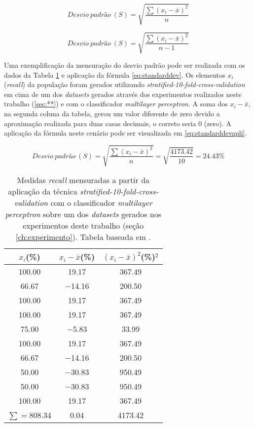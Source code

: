 \begin{equation} 
  Desvio~padrão~(S) = \sqrt{\frac{\sum{(x_{i}-\bar{x})^2}}{n}} 
  \label{eq:standarddev}
\end{equation}

\begin{equation} 
  Desvio~padrão~(S) = \sqrt{\frac{\sum{(x_{i}-\bar{x})^2}}{n-1}} 
  \label{eq:standarddevsub}
\end{equation}

Uma exemplificação da mensuração do desvio padrão pode ser realizada com os dados da Tabela \ref{table:datakcrossvalidation} e aplicação da fórmula \ref{eq:standarddev}. Os elementos \textit{$x_{i}$} (\textit{recall}) da população foram gerados utilizando \textit{stratified-10-fold-cross-validation} em cima de um dos \textit{datasets} gerados através dos experimentos realizados neste trabalho (\ref{sec:**}) e com o classificador \textit{multilayer perceptron}. A soma dos \textit{$x_{i}-\bar{x}$}, na segunda coluna da tabela, gerou um valor diferente de zero devido a aproximação realizada para duas casas decimais, o correto seria 0 (zero). A aplicação da fórmula neste cenário pode ser visualizada em \ref{eq:standarddevapli}.

\begin{equation} 
  Desvio~padrão~(S) = \sqrt{\frac{\sum{(x_{i}-\bar{x})^2}}{n}}=\sqrt{\frac{4173.42}{10}}=24.43\%
  \label{eq:standarddevapli}
\end{equation}

\begin{table}[!htp]
  \centering
  \begin{tabular}{|c c c|}
    \hline
       {\bf $x_{i}$(\%)} & {\bf $x_{i}-\bar{x}$(\%)} & {\bf $(x_{i}-\bar{x})^2$(\%)$^2$} \\
    \hline
       100.00 & 19.17 & 367.49\\
    \hline
       66.67 & −14.16 &  200.50\\
     \hline
       100.00 & 19.17 & 367.49\\
    \hline
       100.00 & 19.17 & 367.49\\
     \hline
       75.00 & −5.83 & 33.99\\
    \hline
       100.00 & 19.17 & 367.49\\
     \hline
       66.67 & −14.16 & 200.50\\
    \hline
       50.00 & −30.83 & 950.49\\
     \hline
       50.00 & −30.83 &  950.49\\
    \hline
       100.00 & 19.17 & 367.49\\
    \hline\hline
       $\sum=$808.34 & 0.04 &  4173.42\\
    \hline
  \end{tabular}
  \caption{Medidas \textit{recall} mensuradas a partir da aplicação da técnica \textit{stratified-10-fold-cross-validation} com o classificador \textit{multilayer perceptron} sobre um dos \textit{datasets} gerados nos experimentos deste trabalho (seção \ref{ch:experimento}). Tabela baseada em \cite{Kerr:2002}.}
  \label{table:datakcrossvalidation}
\end{table}
                    
